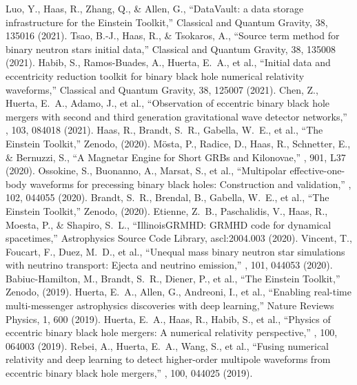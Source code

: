  Luo, Y., Haas, R., Zhang, Q., \& Allen, G., ``DataVault: a data storage infrastructure for the Einstein Toolkit,'' Classical and Quantum Gravity, 38, 135016 (2021).
 Tsao, B.-J., Haas, R., \& Tsokaros, A., ``Source term method for binary neutron stars initial data,'' Classical and Quantum Gravity, 38, 135008 (2021).
 Habib, S., Ramos-Buades, A., Huerta, E.~A., et al., ``Initial data and eccentricity reduction toolkit for binary black hole numerical relativity waveforms,'' Classical and Quantum Gravity, 38, 125007 (2021).
 Chen, Z., Huerta, E.~A., Adamo, J., et al., ``Observation of eccentric binary black hole mergers with second and third generation gravitational wave detector networks,'' \prd, 103, 084018 (2021).
 Haas, R., Brandt, S.~R., Gabella, W.~E., et al., ``The Einstein Toolkit,'' Zenodo, (2020).
 M{\"o}sta, P., Radice, D., Haas, R., Schnetter, E., \& Bernuzzi, S., ``A Magnetar Engine for Short GRBs and Kilonovae,'' \apjl, 901, L37 (2020).
 Ossokine, S., Buonanno, A., Marsat, S., et al., ``Multipolar effective-one-body waveforms for precessing binary black holes: Construction and validation,'' \prd, 102, 044055 (2020).
 Brandt, S.~R., Brendal, B., Gabella, W.~E., et al., ``The Einstein Toolkit,'' Zenodo, (2020).
 Etienne, Z.~B., Paschalidis, V., Haas, R., Moesta, P., \& Shapiro, S.~L., ``IllinoisGRMHD: GRMHD code for dynamical spacetimes,'' Astrophysics Source Code Library, ascl:2004.003 (2020).
 Vincent, T., Foucart, F., Duez, M.~D., et al., ``Unequal mass binary neutron star simulations with neutrino transport: Ejecta and neutrino emission,'' \prd, 101, 044053 (2020).
 Babiuc-Hamilton, M., Brandt, S.~R., Diener, P., et al., ``The Einstein Toolkit,'' Zenodo, (2019).
 Huerta, E.~A., Allen, G., Andreoni, I., et al., ``Enabling real-time multi-messenger astrophysics discoveries with deep learning,'' Nature Reviews Physics, 1, 600 (2019).
 Huerta, E.~A., Haas, R., Habib, S., et al., ``Physics of eccentric binary black hole mergers: A numerical relativity perspective,'' \prd, 100, 064003 (2019).
 Rebei, A., Huerta, E.~A., Wang, S., et al., ``Fusing numerical relativity and deep learning to detect higher-order multipole waveforms from eccentric binary black hole mergers,'' \prd, 100, 044025 (2019).
